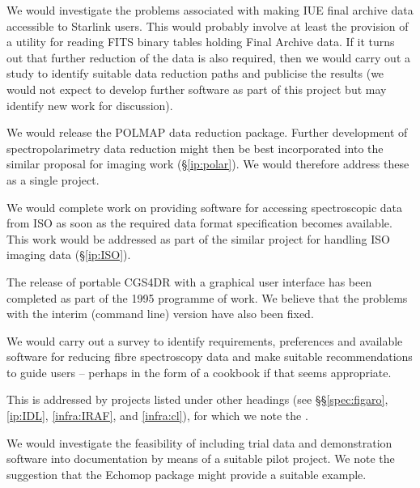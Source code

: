 {We would investigate the problems associated with making IUE final
archive data accessible to Starlink users. This would probably involve
at least the provision of a utility for reading FITS binary tables
holding Final Archive data. If it turns out that further reduction of
the data is also required, then we would carry out a study to identify
suitable data reduction paths and publicise the results (we would not
expect to develop further software as part of this project but may
identify new work for discussion).}

{We would release the POLMAP data reduction package. Further
development of spectropolarimetry data reduction might then be best
incorporated into the similar proposal for imaging work
(\S\ref{ip:polar}). We would therefore address these as a single
project.}

{We would complete work on providing software for accessing
spectroscopic data from ISO as soon as the required data format
specification becomes available.  This work would be addressed as part
of the similar project for handling ISO imaging data
(\S\ref{ip:ISO}).}

{The release of portable CGS4DR with a graphical user interface has
been completed as part of the 1995 programme of work. We believe that
the problems with the interim (command line) version
 have also
been fixed.}

{We would carry out a survey to identify requirements, preferences and
available software for reducing fibre spectroscopy data and make
suitable recommendations to guide users -- perhaps in the form of a
cookbook if that seems appropriate.}

{This is addressed by projects listed under other headings (see
\S\S\ref{spec:figaro}, \ref{ip:IDL}, \ref{infra:IRAF}, and
\ref{infra:cl}), for which we note the .}

{We would investigate the feasibility of including trial data and
demonstration software into documentation by means of a suitable pilot
project. We note the suggestion that the Echomop package might provide
a suitable example.}

